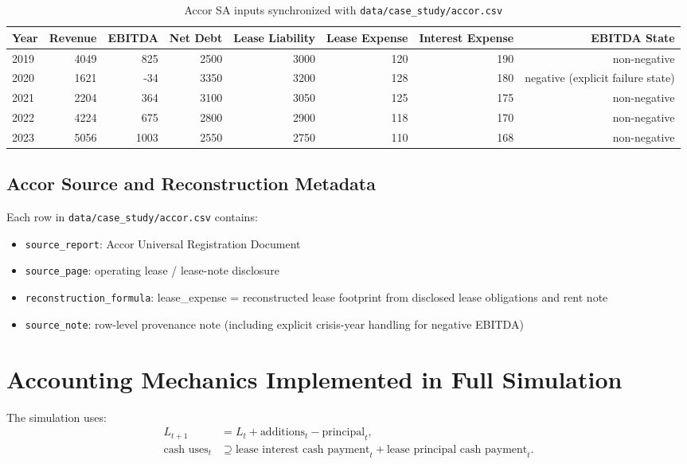 ﻿\documentclass[11pt,a4paper]{article}
\begin{document}
\begin{table}[H]
\centering
\caption{Accor SA inputs synchronized with \texttt{data/case\_study/accor.csv}}
\label{tab:accor_sync}
\begin{tabular}{lrrrrrrr}
\toprule
Year & Revenue & EBITDA & Net Debt & Lease Liability & Lease Expense & Interest Expense & EBITDA State \\
\midrule
2019 & 4049 & 825 & 2500 & 3000 & 120 & 190 & non-negative \\
2020 & 1621 & -34 & 3350 & 3200 & 128 & 180 & negative (explicit failure state) \\
2021 & 2204 & 364 & 3100 & 3050 & 125 & 175 & non-negative \\
2022 & 4224 & 675 & 2800 & 2900 & 118 & 170 & non-negative \\
2023 & 5056 & 1003 & 2550 & 2750 & 110 & 168 & non-negative \\
\bottomrule
\end{tabular}
\end{table}

\subsection*{Accor Source and Reconstruction Metadata}

Each row in \texttt{data/case\_study/accor.csv} contains:
\begin{itemize}
\item \texttt{source\_report}: Accor Universal Registration Document
\item \texttt{source\_page}: operating lease / lease-note disclosure
\item \texttt{reconstruction\_formula}: lease\_expense = reconstructed lease footprint from disclosed lease obligations and rent note
\item \texttt{source\_note}: row-level provenance note (including explicit crisis-year handling for negative EBITDA)
\end{itemize}

\section{Accounting Mechanics Implemented in Full Simulation}

The simulation uses:
\begin{align}
L_{t+1} &= L_t + \text{additions}_t - \text{principal}_t, \\
\text{cash uses}_t &\supseteq \text{lease interest cash payment}_t + \text{lease principal cash payment}_t.
\end{align}
\end{document}
